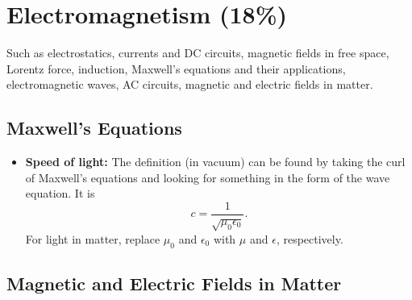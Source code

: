 \documentclass[%
 reprint,
superscriptaddress,
 amsmath,amssymb,
 aps,
prc,
]{revtex4-1}
\begin{document}
\section{Electromagnetism (18\%)}
Such as electrostatics, currents and DC circuits, magnetic fields in free space, Lorentz force, induction, Maxwell's equations and their applications, electromagnetic waves, AC circuits, magnetic and electric fields in matter.

\subsection{Maxwell's Equations}

\begin{itemize}
	\item \textbf{Speed of light:} The definition (in vacuum) can be found by taking the curl of Maxwell's equations and looking for something in the form of the wave equation. It is
	\begin{equation}
	    c=\frac{1}{\sqrt{\mu_0\epsilon_0}}.
	\end{equation}
	For light in matter, replace $\mu_0$ and $\epsilon_0$ with $\mu$ and $\epsilon$, respectively.
\end{itemize}

\subsection{Magnetic and Electric Fields in Matter}
\end{document}
